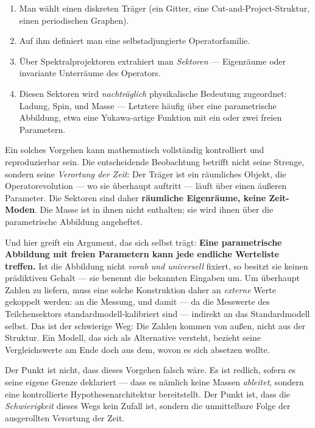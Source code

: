 \documentclass[11pt,a4paper]{article}
\begin{document}
\begin{enumerate}[leftmargin=1.6em,itemsep=0.2em]
  \item Man wählt einen diskreten Träger (ein Gitter, eine Cut-and-Project-Struktur, einen periodischen Graphen).
  \item Auf ihm definiert man eine selbstadjungierte Operatorfamilie.
  \item Über Spektralprojektoren extrahiert man \emph{Sektoren} --- Eigenräume oder invariante Unterräume des Operators.
  \item Diesen Sektoren wird \emph{nachträglich} physikalische Bedeutung zugeordnet: Ladung, Spin, und Masse --- Letztere häufig über eine parametrische Abbildung, etwa eine Yukawa-artige Funktion mit ein oder zwei freien Parametern.
\end{enumerate}

Ein solches Vorgehen kann mathematisch vollständig kontrolliert und reproduzierbar sein. Die entscheidende Beobachtung betrifft nicht seine Strenge, sondern seine \emph{Verortung der Zeit}: Der Träger ist ein räumliches Objekt, die Operatorevolution --- wo sie überhaupt auftritt --- läuft über einen äußeren Parameter. Die Sektoren sind daher \textbf{räumliche Eigenräume, keine Zeit-Moden}. Die Masse ist in ihnen nicht enthalten; sie wird ihnen über die parametrische Abbildung angeheftet.

Und hier greift ein Argument, das sich selbst trägt: \textbf{Eine parametrische Abbildung mit freien Parametern kann jede endliche Werteliste treffen.} Ist die Abbildung nicht \emph{vorab und universell} fixiert, so besitzt sie keinen prädiktiven Gehalt --- sie benennt die bekannten Eingaben um. Um überhaupt Zahlen zu liefern, muss eine solche Konstruktion daher an \emph{externe} Werte gekoppelt werden: an die Messung, und damit --- da die Messwerte des Teilchensektors standardmodell-kalibriert sind --- indirekt an das Standardmodell selbst. Das ist der schwierige Weg: Die Zahlen kommen von außen, nicht aus der Struktur. Ein Modell, das sich als Alternative versteht, bezieht seine Vergleichswerte am Ende doch aus dem, wovon es sich absetzen wollte.

Der Punkt ist nicht, dass dieses Vorgehen falsch wäre. Es ist redlich, sofern es seine eigene Grenze deklariert --- dass es nämlich keine Massen \emph{ableitet}, sondern eine kontrollierte Hypothesenarchitektur bereitstellt. Der Punkt ist, dass die \emph{Schwierigkeit} dieses Wegs kein Zufall ist, sondern die unmittelbare Folge der ausgerollten Verortung der Zeit.
\end{document}
